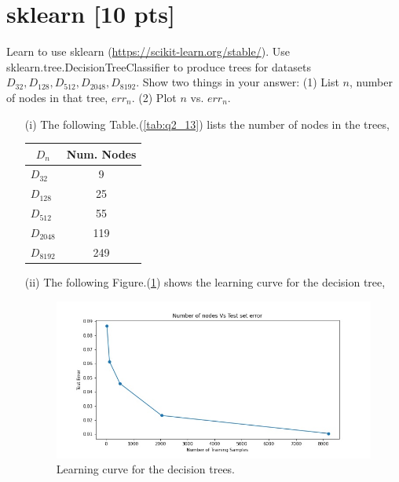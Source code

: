 \documentclass[a4paper]{article}
\theoremstyle{definition}
\newenvironment{soln}{
    \leavevmode\color{blue}\ignorespaces
}{}
\begin{document}
\section{sklearn [10 pts]}
Learn to use sklearn (\url{https://scikit-learn.org/stable/}).
Use sklearn.tree.DecisionTreeClassifier to produce trees for datasets $D_{32}, D_{128}, D_{512}, D_{2048}, D_{8192}$.  Show two things in your answer: (1) List $n$, number of nodes in that tree, $err_n$. (2) Plot $n$ vs. $err_n$.
\\
\begin{soln}
  \begin{itemize}
    \item [(i)] The following Table.(\ref{tab:q2_13}) lists the number of nodes in the trees,
    \begin{table}[H]
      \centering
      \begin{tabular}{|l|c|}
      \hline
      \multicolumn{1}{|c|}{$D_n$} & \textbf{Num. Nodes} \\ \hline
      $D_{32}$                               & 9                   \\ \hline
      $D_{128}$                               & 25                   \\ \hline
      $D_{512}$                               & 55                   \\ \hline
      $D_{2048}$                               & 119                  \\ \hline
      $D_{8192}$                               & 249                   \\ \hline
      \end{tabular}
      \end{table}
      \label{tab:q2_13}


    \item [(ii)] The following Figure.(\ref{fig:q2_14}) shows the learning curve for the decision tree,
    \begin{figure}[H]
      \centering
      \includegraphics[width=12cm]{q3_nodes_v_err.jpg}
      \caption{Learning curve for the decision trees.}
      \label{fig:q2_14}
    \end{figure}

  \end{itemize}

\end{soln}
\end{document}
